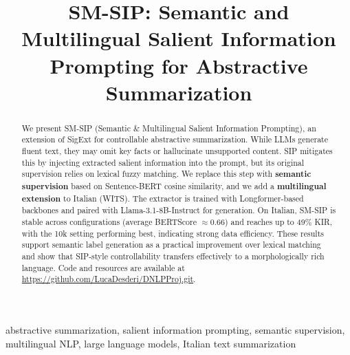 \documentclass[conference]{IEEEtran}
\begin{document}
\title{SM-SIP: Semantic and Multilingual Salient Information Prompting for Abstractive Summarization}

\author{
\and
{}
\and
{}
}

\maketitle

\begin{abstract}
We present SM-SIP (Semantic \& Multilingual Salient Information Prompting), an extension of SigExt for controllable abstractive summarization. While LLMs generate fluent text, they may omit key facts or hallucinate unsupported content. SIP mitigates this by injecting extracted salient information into the prompt, but its original supervision relies on lexical fuzzy matching. We replace this step with \textbf{semantic supervision} based on Sentence-BERT cosine similarity, and we add a \textbf{multilingual extension} to Italian (WITS). The extractor is trained with Longformer-based backbones and paired with Llama-3.1-8B-Instruct for generation. On Italian, SM-SIP is stable across configurations (average BERTScore \(\approx 0.66\)) and reaches up to 49\% KIR, with the 10k setting performing best, indicating strong data efficiency. These results support semantic label generation as a practical improvement over lexical matching and show that SIP-style controllability transfers effectively to a morphologically rich language. Code and resources are available at \url{https://github.com/LucaDesderi/DNLPProj.git}.
\end{abstract}

\begin{IEEEkeywords}
abstractive summarization, salient information prompting, semantic supervision, multilingual NLP, large language models, Italian text summarization
\end{IEEEkeywords}
\end{document}
